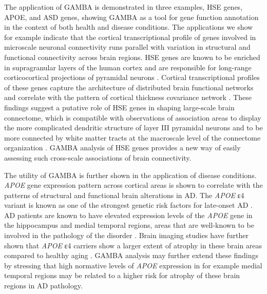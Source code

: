 \begin{refsection}
The application of GAMBA is demonstrated in three examples, HSE genes, APOE, and ASD genes, showing GAMBA as a tool for gene function annotation in the context of both health and disease conditions. The applications we show for example indicate that the cortical transcriptional profile of genes involved in microscale neuronal connectivity runs parallel with variation in structural and functional connectivity across brain regions. HSE genes are known to be enriched in supragranular layers of the human cortex and are responsible for long-range corticocortical projections of pyramidal neurons \citep{Zeng2012LargeScaleCG}. Cortical transcriptional profiles of these genes capture the architecture of distributed brain functional networks \citep{krienen2016transcriptional} and correlate with the pattern of cortical thickness covariance network \citep{RomeroGarcia2018StructuralCN}. These findings suggest a putative role of HSE genes in shaping large-scale brain connectome, which is compatible with observations of association areas to display the more complicated dendritic structure of layer III pyramidal neurons and to be more connected by white matter tracts at the macroscale level of the connectome organization \citep{Scholtens2018MultimodalCI,Heuvel2019MultiscaleNO}. GAMBA analysis of HSE genes provides a new way of easily assessing such cross-scale associations of brain connectivity.

The utility of GAMBA is further shown in the application of disease conditions. \textit{APOE} gene expression pattern across cortical areas is shown to correlate with the patterns of structural and functional brain alterations in AD. The \textit{APOE} ε4 variant is known as one of the strongest genetic risk factors for late-onset AD \citep{Jansen2019GenomewideMI,Liu2013ApolipoproteinEA,Karch2015AlzheimersDR}. AD patients are known to have elevated expression levels of the \textit{APOE} gene in the hippocampus and medial temporal regions, areas that are well-known to be involved in the pathology of the disorder \citep{Akram2012AssociationOA,Linnertz2014TheCE,Matsui2007ExpressionOA}. Brain imaging studies have further shown that \textit{APOE} ε4 carriers show a larger extent of atrophy in these brain areas compared to healthy aging \citep{Agosta2009ApolipoproteinEE,Cacciaglia2018EffectsOA,Manning2014APOEI}. GAMBA analysis may further extend these findings by stressing that high normative levels of \textit{APOE} expression in for example medial temporal regions may be related to a higher risk for atrophy of these brain regions in AD pathology.


\end{refsection}
